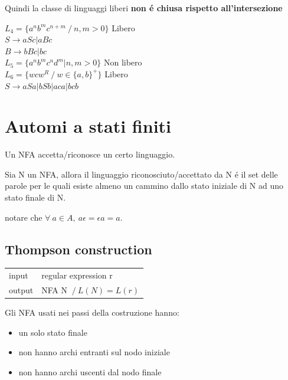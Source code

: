 \begin{tcolorbox}\begin{center}
    Quindi la classe di linguaggi liberi \textbf{non \'e chiusa rispetto all'intersezione}
\end{center}\end{tcolorbox}

$L_4 = \{a^nb^mc^{n+m} \ / \ n,m>0\}$ Libero\\
$S \rightarrow aSc | aBc$\\
$B \rightarrow bBc|bc$\\

$L_5 = \{ a^nb^mc^nd^m | n,m > 0\}$ Non libero \\
$L_6= \{ wcw^R \ / \ w \in \{a,b\}^+\}$ Libero \\
$S \rightarrow aSa | bSb | aca|bcb$

\chapter{Automi a stati finiti}

Un NFA accetta/riconosce un certo linguaggio.

Sia N un NFA, allora il linguaggio riconosciuto/accettato da N \'e il set delle parole per le quali esiste almeno un cammino dallo stato iniziale di N ad uno stato finale di N.

notare che $\forall\ a \in A,\ a\epsilon = \epsilon a = a$.

\section{Thompson construction}
\begin{center}
    \begin{tabular}{ll}
        input & regular expression r\\
        output & NFA N $\ / \ L(N) = L(r)$\\ 
    \end{tabular}
\end{center}
Gli NFA usati nei passi della costruzione hanno:
\begin{itemize}
    \item un solo stato finale\\ 
    \item non hanno archi entranti sul nodo iniziale\\ 
    \item non hanno archi uscenti dal nodo finale\\
\end{itemize}

